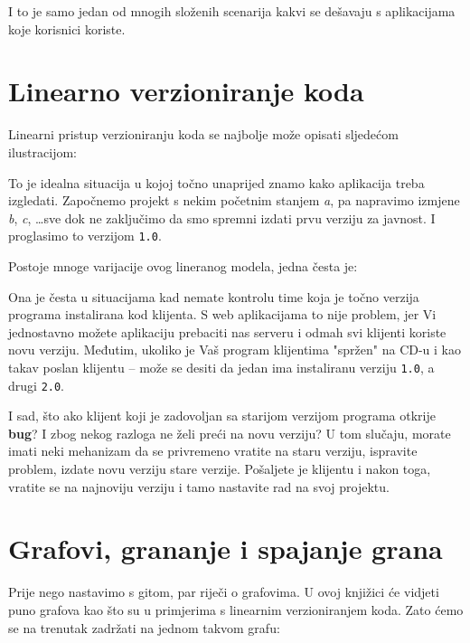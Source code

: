I to je samo jedan od mnogih složenih scenarija kakvi se dešavaju s aplikacijama koje korisnici koriste.

\section*{Linearno verzioniranje koda}

Linearni pristup verzioniranju koda se najbolje može opisati sljedećom ilustracijom:



To je idealna situacija u kojoj točno unaprijed znamo kako aplikacija treba izgledati. 
Započnemo projekt s nekim početnim stanjem \emph a, pa napravimo izmjene \emph b, \emph c, \dots sve dok ne zaključimo da smo spremni izdati prvu verziju za javnost.
I proglasimo to verzijom \texttt{1.0}. 

Postoje mnoge varijacije ovog lineranog modela, jedna česta je:



Ona je česta u situacijama kad nemate kontrolu time koja je točno verzija programa instalirana kod klijenta. 
S web aplikacijama to nije problem, jer Vi jednostavno možete aplikaciju prebaciti nas serveru i odmah svi klijenti koriste novu verziju.
Međutim, ukoliko je Vaš program klijentima "spržen" na CD-u i kao takav poslan klijentu -- može se desiti da jedan ima instaliranu verziju \texttt{1.0}, a drugi \texttt{2.0}.

I sad, što ako klijent koji je zadovoljan sa starijom verzijom programa otkrije \textbf{bug}?
I zbog nekog razloga ne želi preći na novu verziju?
U tom slučaju, morate imati neki mehanizam da se privremeno vratite na staru verziju, ispravite problem, izdate novu verziju stare verzije. 
Pošaljete je klijentu i nakon toga, vratite se na najnoviju verziju i tamo nastavite rad na svoj projektu.

\section*{Grafovi, grananje i spajanje grana}

Prije nego nastavimo s gitom, par riječi o grafovima. 
U ovoj knjižici će vidjeti puno grafova kao što su u primjerima s linearnim verzioniranjem koda. 
Zato ćemo se na trenutak zadržati na jednom takvom grafu:

